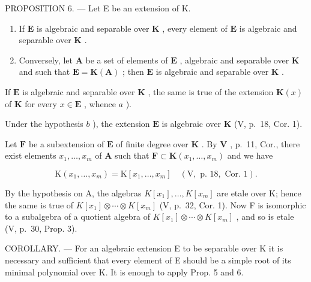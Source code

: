 PROPOSITION 6. --- Let E be an extension of K.

\begin{enumerate}
\def\labelenumi{\alph{enumi})}
\item
  If \(\mathbf{E}\) is algebraic and separable over \(\mathbf{K}\) , every element of \(\mathbf{E}\) is algebraic and separable over \(\mathbf{K}\) .
\item
  Conversely, let \(\mathbf{A}\) be a set of elements of \(\mathbf{E}\) , algebraic and separable over \(\mathbf{K}\) and such that \(\mathbf{E} = \mathbf{K}(\mathbf{A})\) ; then \(\mathbf{E}\) is algebraic and separable over \(\mathbf{K}\) .
\end{enumerate}

If \(\mathbf{E}\) is algebraic and separable over \(\mathbf{K}\) , the same is true of the extension \(\mathbf{K}(x)\) of \(\mathbf{K}\) for every \(x \in \mathbf{E}\) , whence \(a\) ).

Under the hypothesis \(b\) ), the extension \(\mathbf{E}\) is algebraic over \(\mathbf{K}\) (V, p.~18, Cor. 1).

Let \(\mathbf{F}\) be a subextension of \(\mathbf{E}\) of finite degree over \(\mathbf{K}\) . By \(\mathbf{V}\) , p.~11, Cor., there exist elements \(x_{1},\ldots ,x_{m}\) of \(\mathbf{A}\) such that \(\mathbf{F}\subset \mathbf{K}(x_1,\dots,x_m)\) and we have

\[
\mathrm{K} \left(x _ {1}, \dots , x _ {m}\right) = \mathrm{K} \left[ x _ {1}, \dots , x _ {m} \right] \quad (\mathrm{V}, \text { p. } 1 8, \text { Cor. } 1).
\]

By the hypothesis on A, the algebras \(K[x_{1}], \ldots, K[x_{m}]\) are etale over K; hence the same is true of \(K[x_{1}] \otimes \cdots \otimes K[x_{m}]\) (V, p.~32, Cor. 1). Now F is isomorphic to a subalgebra of a quotient algebra of \(K[x_{1}] \otimes \cdots \otimes K[x_{m}]\) , and so is etale (V, p.~30, Prop. 3).

COROLLARY. --- For an algebraic extension E to be separable over K it is necessary and sufficient that every element of E should be a simple root of its minimal polynomial over K. It is enough to apply Prop. 5 and 6.

